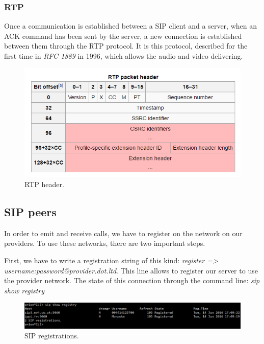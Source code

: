 \subsubsection{RTP}
Once a communication is established between a SIP client and a server, when an ACK command has been sent by the server, a new connection is established between them through the RTP protocol. It is this protocol, described for the first time in \textit{RFC 1889} in 1996, which allows the audio and video delivering. 

 
\begin{figure}[!ht]
  \caption{RTP header.}
  \centering
    \includegraphics[width=1\textwidth]{img/rtpheader.png}
\end{figure}



\subsection{SIP peers}
In order to emit and receive calls, we have to register on the network on our providers. To use these networks, there are two important steps. 


First, we have to write a registration string of this kind: \textit{register => username:password@provider.dot.ltd}. This line allows to register our server to use the provider network. The state of this connection through the command line: \textit{sip show registry}

\begin{figure}[!ht]
  \caption{SIP registrations.}
  \centering
    \includegraphics[width=1\textwidth]{img/sipshowregistry.png}
\end{figure}



